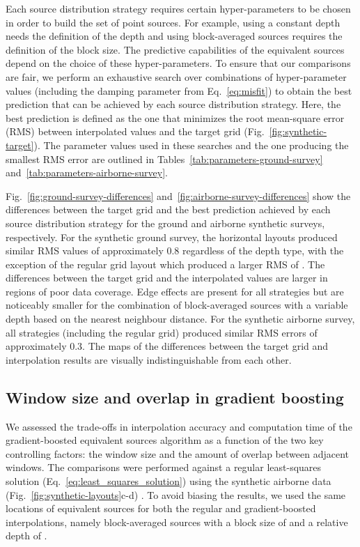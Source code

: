 Each source distribution strategy requires certain hyper-parameters to be
chosen in order to build the set of point sources.
For example, using a constant depth needs the definition of the depth and using
block-averaged sources requires the definition of the block size.
The predictive capabilities of the equivalent sources depend on the choice of
these hyper-parameters.
To ensure that our comparisons are fair, we perform an exhaustive search over
combinations of hyper-parameter values (including the damping parameter from
Eq.~\ref{eq:misfit}) to obtain the best prediction that can be achieved by each
source distribution strategy.
Here, the best prediction is defined as the one that minimizes the root
mean-square error (RMS) between interpolated values and the target grid
(Fig.~\ref{fig:synthetic-target}).
The parameter values used in these searches and the one producing the smallest
RMS error are outlined in Tables~\ref{tab:parameters-ground-survey}
and~\ref{tab:parameters-airborne-survey}.

Fig.~\ref{fig:ground-survey-differences}
and~\ref{fig:airborne-survey-differences} show the differences between the
target grid and the best prediction achieved by each source distribution
strategy for the ground and airborne synthetic surveys, respectively.
For the synthetic ground survey, the horizontal layouts produced similar RMS
values of approximately 0.8\mGal{} regardless of the depth type, with the
exception of the regular grid layout which produced a larger RMS of
\BestGroundGridSourcesConstantDepthRms{}\mGal{}.
The differences between the target grid and the interpolated values are larger
in regions of poor data coverage.
Edge effects are present for all strategies but are noticeably smaller for the
combination of block-averaged sources with a variable depth based on the
nearest neighbour distance.
For the synthetic airborne survey, all strategies (including the regular grid)
produced similar RMS errors of approximately 0.3\mGal{}.
The maps of the differences between the target grid and interpolation results
are visually indistinguishable from each other.



\subsection{Window size and overlap in gradient boosting}
\label{sec:window_size_and_overlap}

We assessed the trade-offs in interpolation accuracy and computation time of
the gradient-boosted equivalent sources algorithm as a function of the two key
controlling factors: the window size and the amount of overlap between adjacent
windows.
The comparisons were performed against a regular least-squares solution
(Eq.~\ref{eq:least_squares_solution}) using the synthetic airborne data
(Fig.~\ref{fig:synthetic-layouts}c-d) .
To avoid biasing the results, we used the same locations of equivalent sources
for both the regular and gradient-boosted interpolations, namely
block-averaged sources with a block size of
\BestAirborneBlockAveragedSourcesRelativeDepthSpacing\m{} and a
relative depth of
\BestAirborneBlockAveragedSourcesRelativeDepthDepth\m{}.

